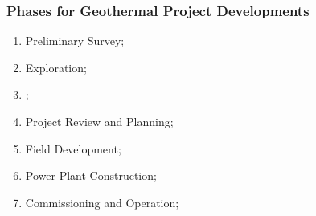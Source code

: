 \documentclass[10pt,compress,unknownkeysallowed]{beamer}
\begin{document}
\begin{frame}
 \frametitle{Phases for Geothermal Project Developments} 
    \begin{enumerate}[1.]
       \item <1-> Preliminary Survey;
       \item <1-> Exploration; 
       \item <2-> ;
       \item <1-> Project Review and Planning;
       \item <1-> Field Development; 
       \item <1-> Power Plant Construction;
       \item <1-> Commissioning and Operation;
    \end{enumerate}
\end{frame}
\end{document}
